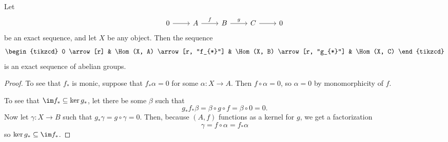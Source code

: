 \documentclass[main.tex]{subfiles}
\begin{document}
\begin{lemma}
  \label{lemma:hom_functor_left_exact}
  Let
  \begin{equation*}
    \begin{tikzcd}
      0
      \arrow[r]
      & A
      \arrow[r, "f"]
      & B
      \arrow[r, "g"]
      & C
      \arrow[r]
      & 0
    \end{tikzcd}
  \end{equation*}
  be an exact sequence, and let $X$ be any object. Then the sequence
  \begin{equation*}
    \begin{tikzcd}
      0
      \arrow[r]
      & \Hom(X, A)
      \arrow[r, "f_{*}"]
      & \Hom(X, B)
      \arrow[r, "g_{*}"]
      & \Hom(X, C)
    \end{tikzcd}
  \end{equation*}
  is an exact sequence of abelian groups.
\end{lemma}
\begin{proof}
  To see that $f_{*}$ is monic, suppose that $f_{*}\alpha = 0$ for some $\alpha\colon X \to A$. Then $f \circ \alpha = 0$, so $\alpha = 0$ by monomorphicity of $f$.

  To see that $\im f_{*} \subseteq \ker g_{*}$, let there be some $\beta$ such that
  \begin{equation*}
    g_{*}f_{*}\beta = \beta \circ g \circ f = \beta \circ 0 = 0.
  \end{equation*}
  Now let $\gamma\colon X \to B$ such that $g_{*}\gamma = g \circ \gamma = 0$. Then, because $(A, f)$ functions as a kernel for $g$, we get a factorization
  \begin{equation*}
    \gamma = f \circ \alpha = f_{*}\alpha
  \end{equation*}
  so $\ker g_{*} \subseteq \im f_{*}$.
\end{proof}
\end{document}
